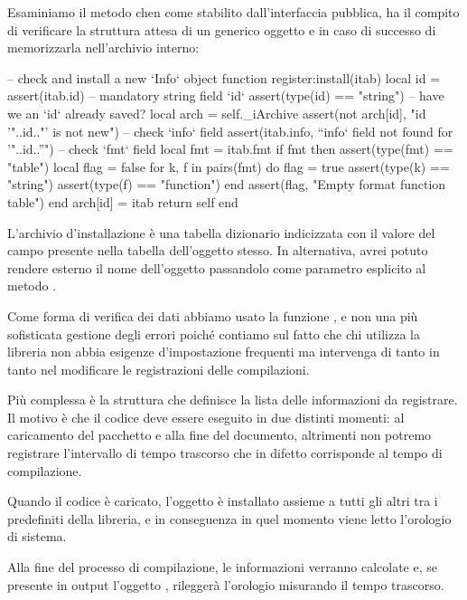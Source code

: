 Esaminiamo il metodo  chen come stabilito dall'interfaccia pubblica,
ha il compito di verificare la struttura attesa di un generico oggetto
 e in caso di successo di memorizzarla nell'archivio interno:
\begin{lines}
-- check and install a new `Info` object
function register:install(itab)
    local id = assert(itab.id) -- mandatory string field `id`
    assert(type(id) == "string")
    -- have we an `id` already saved?
    local arch = self._iArchive
    assert(not arch[id], "id '"..id.."' is not new")
    -- check `info` field
    assert(itab.info, "`info` field not found for '"..id.."'")
    -- check `fmt` field
    local fmt = itab.fmt
    if fmt then
        assert(type(fmt) == "table")
        local flag = false
        for k, f in pairs(fmt) do
            flag = true
            assert(type(k) == "string")
            assert(type(f) == "function")
        end
        assert(flag, "Empty format function table")
    end
    arch[id] = itab
    return self
end
\end{lines}

L'archivio d'installazione è una tabella dizionario indicizzata con il valore
del campo  presente nella tabella dell'oggetto  stesso. In
alternativa, avrei potuto rendere esterno il nome dell'oggetto passandolo come
parametro esplicito al metodo .

Come forma di verifica dei dati abbiamo usato la funzione , e non una
più sofisticata gestione degli errori poiché contiamo sul fatto che chi utilizza
la libreria non abbia esigenze d'impostazione frequenti ma intervenga di tanto
in tanto nel modificare le registrazioni delle compilazioni.

Più complessa è la struttura che definisce la lista delle informazioni da
registrare. Il motivo è che il codice deve essere eseguito in due distinti
momenti: al caricamento del pacchetto e alla fine del documento, altrimenti non
potremo registrare l'intervallo di tempo trascorso che in difetto corrisponde al
tempo di compilazione.

Quando il codice è caricato, l'oggetto  è installato assieme a
tutti gli altri tra i predefiniti della libreria, e in conseguenza in quel
momento viene letto l'orologio di sistema. 

Alla fine del processo di compilazione, le informazioni verranno calcolate e,
se presente in output l'oggetto , rileggerà l'orologio
misurando il tempo trascorso.

